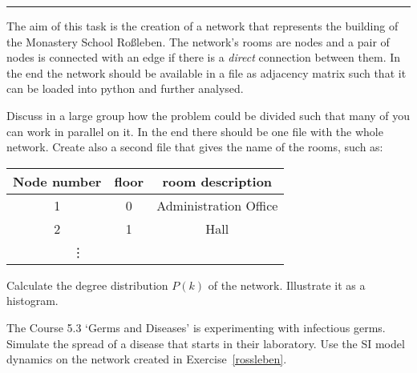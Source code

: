

\usepackage{pstricks,pst-node,pst-tree}





  \sheet[%
  number=4,
      topic={Contagion Dynamics},
    ]

\vspace{-1cm}
\noindent\rule{12cm}{0.4pt}

  \exercise[%
  topic = A Network of the Monastery School Ro\ss leben 
    ]

\label{rossleben}

The aim of this task is the creation of a network that represents the building of the Monastery School Ro\ss leben. The network's rooms are nodes and a pair of nodes is connected with an edge if there is a \emph{direct} connection between them. In the end the network should be available in a file as adjacency matrix such that it can be loaded into python and further analysed.

 \subexercise[%
  topic=Dividing the Problem up,
    ]

Discuss in a large group how the problem could be divided such that many of you can work in parallel on it. In the end there should be one file with the whole network. Create also a second file that gives the name of the rooms, such as:


\begin{tabular}[h]{c|c|c}
Node number & floor & room description \\ \hline
1 & 0 & Administration Office\\
2 & 1 & Hall\\
\multicolumn{2}{c}{\vdots}
\end{tabular}



 \subexercise[%
  topic= Degree distribution,
    ]

Calculate the degree distribution $P(k)$ of the network. Illustrate it as a histogram.


\exercise[%
  topic =  Pandemic in the Monastery School
    ]

The Course 5.3 `Germs and Diseases' is experimenting with infectious germs. Simulate the spread of a disease that starts in their laboratory. Use the SI model dynamics on the network created in Exercise~\ref{rossleben}.


\subexercise[%
  topic= Complete Infection,
    ]


